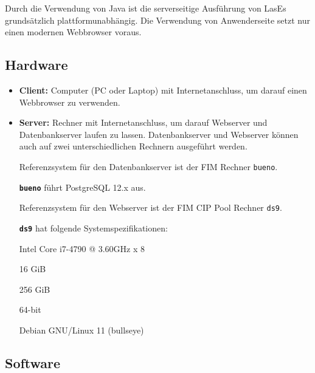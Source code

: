 
Durch die Verwendung von Java ist die serverseitige Ausführung von LasEs
grundsätzlich plattformunabhängig.
Die Verwendung von Anwenderseite setzt nur einen modernen Webbrowser voraus.

\subsection{Hardware}

\begin{itemize}
	\item \textbf{Client:} Computer (PC oder Laptop) mit Internetanschluss, um darauf einen Webbrowser zu verwenden.

	\item \textbf{Server:} Rechner mit Internetanschluss, um darauf Webserver und Datenbankserver laufen zu lassen. Datenbankserver und Webserver können auch auf zwei unterschiedlichen Rechnern ausgeführt werden.

	Referenzsystem für den Datenbankserver ist der FIM Rechner \texttt{bueno}.

	\texttt{\textbf{bueno}} führt PostgreSQL 12.x aus.

	Referenzsystem für den Webserver ist der FIM CIP Pool Rechner \texttt{ds9}.

	\texttt{\textbf{ds9}} hat folgende Systemspezifikationen:

	\begin{itemize}
		 Intel Core i7-4790 @ 3.60GHz x 8

		 16 GiB

		 256 GiB

		 64-bit

		 Debian GNU/Linux 11 (bullseye)
	\end{itemize}


\end{itemize}

\subsection{Software}

